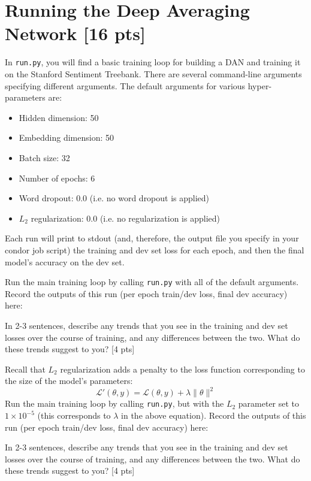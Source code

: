 \documentclass[11pt]{article}
\begin{document}
\section{Running the Deep Averaging Network [16 pts]}

In \texttt{run.py}, you will find a basic training loop for building a DAN and training it on the Stanford Sentiment Treebank.  There are several command-line arguments specifying different arguments.  The default arguments for various hyper-parameters are:
\begin{itemize}
  \item Hidden dimension: 50
  \item Embedding dimension: 50
  \item Batch size: 32
  \item Number of epochs: 6
  \item Word dropout: 0.0 (i.e. no word dropout is applied)
  \item $L_2$ regularization: 0.0 (i.e. no regularization is applied)
\end{itemize}
Each run will print to stdout (and, therefore, the output file you specify in your condor job script) the training and dev set loss for each epoch, and then the final model's accuracy on the dev set.

\vspace{2em}
 Run the main training loop by calling \texttt{run.py} with all of the default arguments.  Record the outputs of this run (per epoch train/dev loss, final dev accuracy) here: 

\vspace{2em}
\noindent In 2-3 sentences, describe any trends that you see in the training and dev set losses over the course of training, and any differences between the two.  What do these trends suggest to you? \hfill [4 pts]


\vspace{2em}
 Recall that $L_2$ regularization adds a penalty to the loss function corresponding to the size of the model's parameters:
\[ \mathcal{L}'(\theta, y) = \mathcal{L}(\theta, y) + \lambda \|\theta\|^2 \]
Run the main training loop by calling \texttt{run.py}, but with the $L_2$ parameter set to $1\times10^{-5}$ (this corresponds to $\lambda$ in the above equation).  Record the outputs of this run (per epoch train/dev loss, final dev accuracy) here:

\vspace{2em}
\noindent In 2-3 sentences, describe any trends that you see in the training and dev set losses over the course of training, and any differences between the two.  What do these trends suggest to you? \hfill [4 pts]
\end{document}

